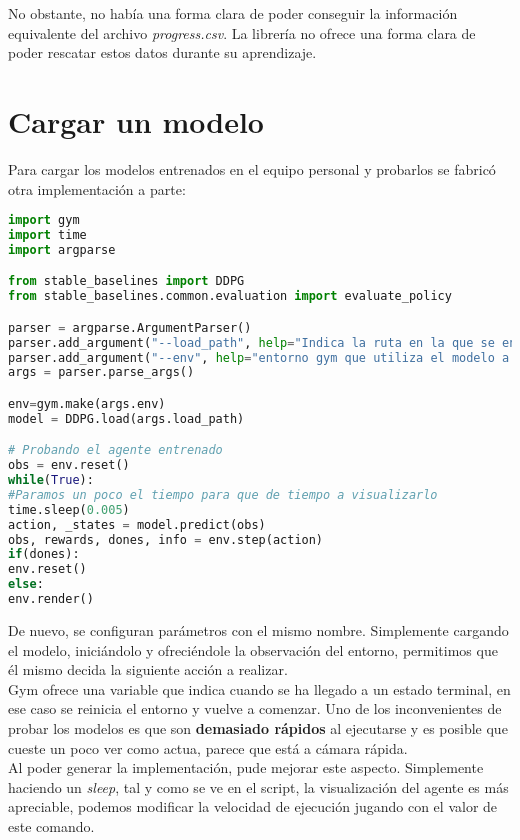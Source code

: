 \documentclass[11pt,fleqn]{book} %
\begin{document}
No obstante, no había una forma clara de poder conseguir la información equivalente del archivo \textit{progress.csv}. La librería no ofrece una forma clara de poder rescatar estos datos durante su aprendizaje.

\section{Cargar un modelo}

Para cargar los modelos entrenados en el equipo personal y probarlos se fabricó otra implementación a parte: \\

\begin{lstlisting}[language=python]
import gym
import time
import argparse

from stable_baselines import DDPG
from stable_baselines.common.evaluation import evaluate_policy

parser = argparse.ArgumentParser()
parser.add_argument("--load_path", help="Indica la ruta en la que se encuentra el modelo a cargar")
parser.add_argument("--env", help="entorno gym que utiliza el modelo a cargar")
args = parser.parse_args()

env=gym.make(args.env)
model = DDPG.load(args.load_path)

# Probando el agente entrenado
obs = env.reset()
while(True):
#Paramos un poco el tiempo para que de tiempo a visualizarlo
time.sleep(0.005)
action, _states = model.predict(obs)
obs, rewards, dones, info = env.step(action)
if(dones):
env.reset()
else:
env.render()
\end{lstlisting}

De nuevo, se configuran parámetros con el mismo nombre. Simplemente cargando el modelo, iniciándolo y ofreciéndole la observación del entorno, permitimos que él mismo decida la siguiente acción a realizar. \\

Gym ofrece una variable que indica cuando se ha llegado a un estado terminal, en ese caso se reinicia el entorno y vuelve a comenzar. Uno de los inconvenientes de probar los modelos es que son \textbf{demasiado rápidos} al ejecutarse y es posible que cueste un poco ver como actua, parece que está a cámara rápida. \\

Al poder generar la implementación, pude mejorar este aspecto. Simplemente haciendo un \textit{sleep}, tal y como se ve en el script, la visualización del agente es más apreciable, podemos modificar la velocidad de ejecución jugando con el valor de este comando.\\

\cleardoublepage %
\setlength{\columnsep}{0.75cm} %
\printindex %

\end{document}
